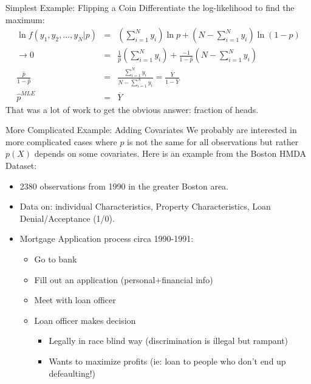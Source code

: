 \documentclass[aspectratio=169]{beamer}
\begin{document}
\begin{frame}{Simplest Example: Flipping a Coin}
Differentiate the log-likelihood to find the maximum:
\begin{eqnarray*}
\ln  f(y_1,y_2,\ldots,y_N | p )  &=& \left( \sum_{i=1}^N y_i \right)  \ln p  + \left(N-\sum_{i=1}^N y_i \right)  \ln(1-p)\\
\rightarrow 0&=& \frac{1}{\hat{p}}  \left( \sum_{i=1}^N y_i \right) + \frac{-1}{1-\hat{p}}   \left(N-\sum_{i=1}^N y_i \right) \\
 \frac{\hat{p}}{1-\hat{p}} &=& \frac{\sum_{i=1}^N y_i }{N- \sum_{i=1}^N y_i } = \frac{\overline{Y}}{1-\overline{Y}} \\
\hat{p}^{MLE} &=& \overline{Y}
\end{eqnarray*}
That was a lot of work to get the obvious answer: \alert{fraction of heads}.
\end{frame}

\begin{frame}{More Complicated Example: Adding Covariates}
We probably are interested in more complicated cases where $p$ is not the same for all observations but rather $p(X)$ depends on some covariates. Here is an example from the Boston HMDA Dataset:
\begin{itemize}
\item 2380 observations from 1990 in the greater Boston area.
\item Data on: individual Characteristics, Property Characteristics, Loan Denial/Acceptance (1/0).
\item Mortgage Application process circa 1990-1991:
\begin{itemize}
\item Go to bank
\item Fill out an application (personal+financial info)
\item Meet with loan officer
\item Loan officer makes decision
\begin{itemize}
\item Legally in race blind way (discrimination is illegal but rampant)
\item Wants to maximize profits (ie: loan to people who don't end up defeaulting!)
\end{itemize}
\end{itemize}
\end{itemize}
\end{frame}
\end{document}
